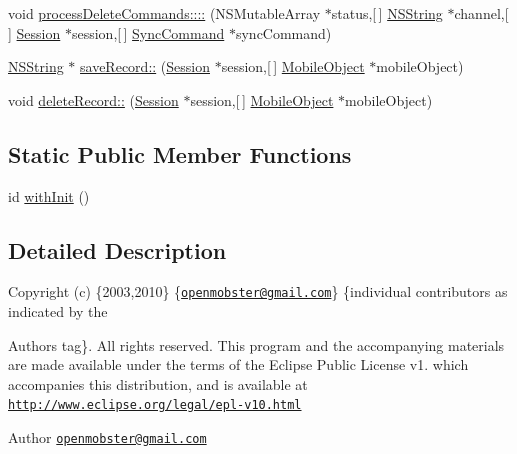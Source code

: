 \begin{DoxyCompactItemize}
\item 
void \hyperlink{interface_sync_engine_a80d225eba8376088611f5503eb0c84cd}{process\-Delete\-Commands\-::::} (\-N\-S\-Mutable\-Array $\ast$status,\mbox{[}$\,$\mbox{]} \hyperlink{class_n_s_string}{\-N\-S\-String} $\ast$channel,\mbox{[}$\,$\mbox{]} \hyperlink{interface_session}{\-Session} $\ast$session,\mbox{[}$\,$\mbox{]} \hyperlink{interface_sync_command}{\-Sync\-Command} $\ast$sync\-Command)
\item 
\hyperlink{class_n_s_string}{\-N\-S\-String} $\ast$ \hyperlink{interface_sync_engine_afaa7aa3a989d16724277843a60e9d54f}{save\-Record\-::} (\hyperlink{interface_session}{\-Session} $\ast$session,\mbox{[}$\,$\mbox{]} \hyperlink{interface_mobile_object}{\-Mobile\-Object} $\ast$mobile\-Object)
\item 
void \hyperlink{interface_sync_engine_a7d102091d243574a3b17d8492b48b9b5}{delete\-Record\-::} (\hyperlink{interface_session}{\-Session} $\ast$session,\mbox{[}$\,$\mbox{]} \hyperlink{interface_mobile_object}{\-Mobile\-Object} $\ast$mobile\-Object)
\end{DoxyCompactItemize}
\subsection*{\-Static \-Public \-Member \-Functions}
\begin{DoxyCompactItemize}
\item 
id \hyperlink{interface_sync_engine_a67d7d4c91dda712944a025158f34e29b}{with\-Init} ()
\end{DoxyCompactItemize}


\subsection{\-Detailed \-Description}
\-Copyright (c) \{2003,2010\} \{\href{mailto:openmobster@gmail.com}{\tt openmobster@gmail.\-com}\} \{individual contributors as indicated by the \begin{DoxyAuthor}{\-Authors}
tag\}. \-All rights reserved. \-This program and the accompanying materials are made available under the terms of the \-Eclipse \-Public \-License v1. which accompanies this distribution, and is available at \href{http://www.eclipse.org/legal/epl-v10.html}{\tt http\-://www.\-eclipse.\-org/legal/epl-\/v10.\-html}
\end{DoxyAuthor}
\begin{DoxyAuthor}{\-Author}
\href{mailto:openmobster@gmail.com}{\tt openmobster@gmail.\-com} 
\end{DoxyAuthor}


